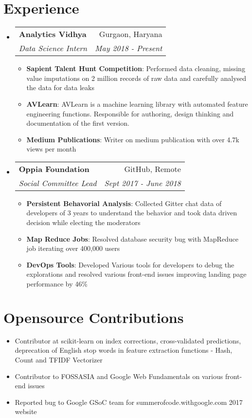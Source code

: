 \documentclass[letterpaper,11pt]{article}
\makeatletter
\newcommand{\resumeItem}[2]{
  \item\small{
    \textbf{#1}{: #2 \vspace{-2pt}}
  }
}
\newcommand{\resumeSubheading}[4]{
  \vspace{-1pt}\item
    \begin{tabular*}{0.97\textwidth}[t]{l@{\extracolsep{\fill}}r}
      \textbf{#1} & #2 \\
      \textit{\small#3} & \textit{\small #4} \\
    \end{tabular*}\vspace{-5pt}
}
\newcommand{\resumeSubHeadingListStart}{\begin{itemize}[leftmargin=*]}
\newcommand{\resumeSubHeadingListEnd}{\end{itemize}}
\newcommand{\resumeItemListStart}{\begin{itemize}}
\newcommand{\resumeItemListEnd}{\end{itemize}\vspace{-5pt}}
\makeatother
\begin{document}
\section{Experience}
  \resumeSubHeadingListStart

    \resumeSubheading
      {Analytics Vidhya}{Gurgaon, Haryana}
      {Data Science Intern}{May 2018 - Present}
      \resumeItemListStart
        \resumeItem{Sapient Talent Hunt Competition}
          {Performed data cleaning, missing value imputations on 2 million records of raw data and carefully analysed the data for data leaks}
        \resumeItem{AVLearn}
          {AVLearn is a machine learning library with automated feature engineering functions. Responsible for authoring, design thinking and documentation of the first version.
        }
        \resumeItem{Medium Publications}
          {Writer on medium publication with over 4.7k views per month}
      \resumeItemListEnd

    \resumeSubheading
      {Oppia Foundation}{GitHub, Remote}
      {Social Committee Lead}{Sept 2017 - June 2018}
      \resumeItemListStart
        \resumeItem{Persistent Behavorial Analysis}
          {Collected Gitter chat data of developers of 3 years to understand the behavior and took data driven decision while electing the moderators}
        \resumeItem{Map Reduce Jobs}
          {Resolved database security bug with MapReduce job iterating over 400,000 users}
        \resumeItem{DevOps Tools}
          {Developed Various tools for developers to debug the explorations and resolved various front-end issues  improving landing page performance by 46\%}
      \resumeItemListEnd

  \resumeSubHeadingListEnd

  \section{Opensource Contributions}
  \begin{itemize}
    \setlength\itemsep{-4pt}
    \item Contributor at scikit-learn on index corrections, cross-validated predictions, deprecation of English stop words
in feature extraction functions - Hash, Count and TFIDF Vectorizer
\item Contributor to FOSSASIA and Google Web Fundamentals on various front-end issues
\item Reported bug to Google GSoC team for summerofcode.withgoogle.com 2017 website
  \end{itemize}
\end{document}
